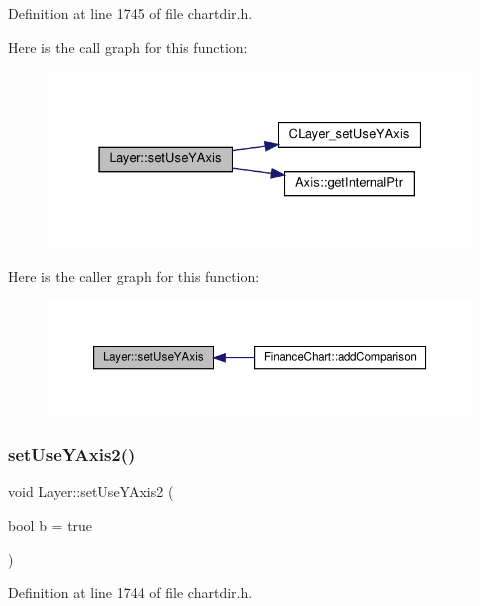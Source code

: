 Definition at line 1745 of file chartdir.\+h.

Here is the call graph for this function\+:
\nopagebreak
\begin{figure}[H]
\begin{center}
\leavevmode
\includegraphics[width=331pt]{class_layer_a5085490db860509f067b0fe68a55fe0a_cgraph}
\end{center}
\end{figure}
Here is the caller graph for this function\+:
\nopagebreak
\begin{figure}[H]
\begin{center}
\leavevmode
\includegraphics[width=350pt]{class_layer_a5085490db860509f067b0fe68a55fe0a_icgraph}
\end{center}
\end{figure}
\mbox{\label{class_layer_ade6f7d6d3b8e9170301f87d5364480bc}} 
\subsubsection{\texorpdfstring{set\+Use\+Y\+Axis2()}{setUseYAxis2()}}
{\footnotesize\ttfamily void Layer\+::set\+Use\+Y\+Axis2 (\begin{DoxyParamCaption}\item[{bool}]{b = {\ttfamily true} }\end{DoxyParamCaption})\hspace{0.3cm}{\ttfamily [inline]}}



Definition at line 1744 of file chartdir.\+h.

